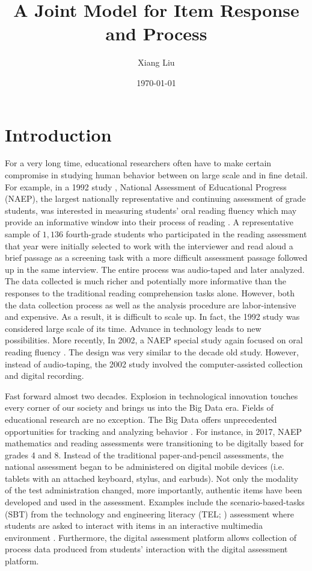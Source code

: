 \documentclass[11pt, letterpaper]{article}
\title{A Joint Model for Item Response and Process}
\author{Xiang Liu}
\date{\today}
\begin{document}
	\maketitle
  \section{Introduction}
  For a very long time, educational researchers often have to make certain
  compromise in studying human behavior between on large scale and in fine
  detail. For example, in a 1992 study \parencite{Pinnell1995}, National Assessment of
  Educational Progress (NAEP), the largest nationally representative and
  continuing assessment of grade students, was interested in measuring
  students' oral reading fluency which may provide an informative window into
  their process of reading \parencite{Bergner2018}. A representative sample of
  $1,136$ fourth-grade students who participated in the reading assessment
  that year were initially selected to work with the interviewer and read
  aloud a brief passage as a screening task with a more difficult assessment
  passage followed up in the same interview. The entire process was
  audio-taped and later analyzed. The data collected is much richer and
  potentially more informative than the responses to the traditional reading
  comprehension tasks alone. However, both the data collection process as well
  as the  analysis procedure are labor-intensive and expensive. As a result,
  it is difficult to scale up. In fact, the 1992 study was considered large
  scale of its time. Advance in technology leads to new possibilities. More
  recently, In
  2002, a NAEP special study again focused on oral reading fluency 
  \parencite{Daane2005}. The design was very similar to the decade old study.
  However, instead of audio-taping, the 2002 study involved the
  computer-assisted collection and digital recording. 

  Fast forward almost two decades. Explosion in technological innovation
  touches every corner of our society and brings us into the Big Data era.
  Fields of educational research are no exception. The Big Data offers
  unprecedented opportunities for tracking and analyzing behavior 
  \parencite{Markowetz2014}. For instance, in 2017, NAEP mathematics and reading
  assessments were transitioning to be digitally based for grades 4 and 8.
  Instead of the
  traditional paper-and-pencil assessments, the national assessment began to
  be administered on digital mobile devices (i.e. tablets with an attached
  keyboard, stylus, and earbuds). Not only the modality of the test
  administration changed, more importantly, authentic items have been
  developed and used in the assessment. Examples include the
  scenario-based-tasks (SBT) from the technology and engineering literacy
  (TEL; \cite{TheNationalCenterforEducationStatistics2013}) assessment where
  students are asked to interact with items in an interactive multimedia
  environment \parencite{Hao2015}. Furthermore, the digital assessment platform
  allows collection of process data produced from students' interaction with
  the digital assessment platform.
\end{document}
